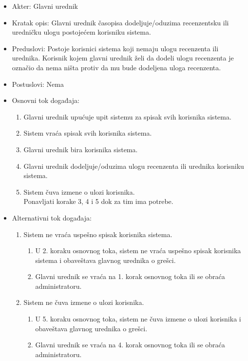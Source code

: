 \documentclass[a4paper]{article}
\begin{document}
\begin{itemize}
    \item Akter: Glavni urednik
    \item Kratak opis: Glavni urednik časopisa dodeljuje/oduzima recenzentsku ili uredničku ulogu postojećem korisniku sistema.
    \item Preduslovi: Postoje korisnici sistema koji nemaju ulogu recenzenta ili urednika. Korisnik kojem glavni urednik želi da dodeli ulogu recenzenta je označio da nema ništa protiv da mu bude dodeljena uloga recenzenta.
    \item Postuslovi: Nema
    \item Osnovni tok događaja:
        \begin{enumerate}
            \item Glavni urednik upućuje upit sistemu za spisak svih korisnika sistema.
            \item Sistem vraća spisak svih korisnika sistema.
            \item Glavni urednik bira korisnika sistema.
            \item Glavni urednik dodeljuje/oduzima ulogu recenzenta ili urednika korisniku sistema.
            \item Sistem čuva izmene o ulozi korisnika.\\
            Ponavljati korake 3, 4 i 5 dok za tim ima potrebe.
        \end{enumerate}
    \item Alternativni tok događaja:
        \begin{enumerate}
            \item Sistem ne vraća uspešno spisak korisnika sistema.
            \begin{enumerate}
                \item U 2. koraku osnovnog toka, sistem ne vraća uspešno spisak korisnika sistema i obaveštava glavnog urednika o grešci.
                \item Glavni urednik se vraća na 1. korak osnovnog toka ili se obraća administratoru.
            \end{enumerate}
            \item Sistem ne čuva izmene o ulozi korisnika.
            \begin{enumerate}
                \item U 5. koraku osnovnog toka, sistem ne čuva izmene o ulozi korisnika i obaveštava glavnog urednika o grešci.
                \item Glavni urednik se vraća na 4. korak osnovnog toka ili se obraća administratoru.
            \end{enumerate}
        \end{enumerate}
\end{itemize}
\end{document}
